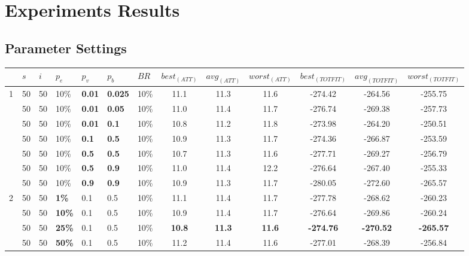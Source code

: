 \chapter{Experiments Results}
\label{appendixC}

\section{Parameter Settings}

\begin{sidewaystable}
    \hspace*{-0.5cm}
    \begin{tabular}{|l|l|l|l|l|l|l||c|c|c|c|c|c|}
    \hline
    ~ & $s$ & $i$ & $p_{e}$ & $p_{v}$ & $p_{b}$ & $BR$ & $best_{(ATT)}$ & $avg_{(ATT)}$ & $worst_{(ATT)}$ & $best_{(TOTFIT)}$ & $avg_{(TOTFIT)}$ & $worst_{(TOTFIT)}$\\
    \hline
    1 & 50 & 50 & 10\% & \textbf{0.01} & \textbf{0.025} & 10\% & 11.1 & 11.3 & 11.6 & -274.42 & -264.56 & -255.75 \\
    ~ & 50 & 50 & 10\% & \textbf{0.01} & \textbf{0.05} & 10\% & 11.0 & 11.4 & 11.7 & -276.74 & -269.38 & -257.73 \\
    ~ & 50 & 50 & 10\% & \textbf{0.01} & \textbf{0.1} & 10\% & 10.8 & 11.2 & 11.8 & -273.98 & -264.20 & -250.51 \\
    ~ & 50 & 50 & 10\% & \textbf{0.1} & \textbf{0.5} & 10\% & 10.9 & 11.3 & 11.7 & -274.36 & -266.87 & -253.59 \\
    ~ & 50 & 50 & 10\% & \textbf{0.5} & \textbf{0.5} & 10\% & 10.7 & 11.3 & 11.6 & -277.71 & -269.27 & -256.79 \\
    ~ & 50 & 50 & 10\% & \textbf{0.5} & \textbf{0.9} & 10\% & 11.0 & 11.4 & 12.2 & -276.64 & -267.40 & -255.33 \\
    ~ & 50 & 50 & 10\% & \textbf{0.9} & \textbf{0.9} & 10\% & 10.9 & 11.3 & 11.7 & -280.05 & -272.60 & -265.57 \\
    \hline
    2 & 50 & 50 & \textbf{1\%} & 0.1 & 0.5 & 10\% & 11.1 & 11.4 & 11.7 & -277.78 & -268.62 & -260.23 \\
    ~ & 50 & 50 & \textbf{10\%} & 0.1 & 0.5 & 10\% & 10.9 & 11.4 & 11.7 & -276.64 & -269.86 & -260.24 \\
    ~ & 50 & 50 & \textbf{25\%} & 0.1 & 0.5 & 10\% &  \textbf{10.8} & \textbf{11.3} & \textbf{11.6} & \textbf{-274.76} & \textbf{-270.52} & \textbf{-265.57} \\
    ~ & 50 & 50 & \textbf{50\%} & 0.1 & 0.5 & 10\% &  11.2 & 11.4 & 11.6 & -277.01 & -268.39 & -256.84 \\

\end{tabular}
\end{sidewaystable}
